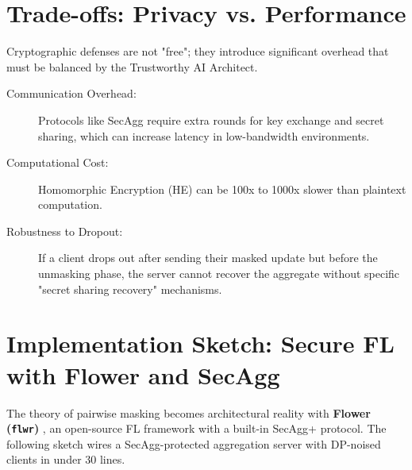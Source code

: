 \section{Trade-offs: Privacy vs. Performance}
\label{sec:secagg_tradeoffs}

Cryptographic defenses are not "free"; they introduce significant overhead that must be balanced by the Trustworthy AI Architect.

\begin{description}
  \item[Communication Overhead:] 
        Protocols like SecAgg require extra rounds for key exchange and secret sharing, which can increase latency in low-bandwidth environments.
  \item[Computational Cost:]
        Homomorphic Encryption (HE) can be 100x to 1000x slower than plaintext computation.
  \item[Robustness to Dropout:]
        If a client drops out after sending their masked update but before the unmasking phase, the server cannot recover the aggregate without specific "secret sharing recovery" mechanisms.
\end{description}

\section{Implementation Sketch: Secure FL with Flower and SecAgg}
\label{sec:secagg_implementation}

The theory of pairwise masking becomes architectural reality with \textbf{Flower (\texttt{flwr})} \cite{flower}, an open-source FL framework with a built-in SecAgg+ protocol. The following sketch wires a SecAgg-protected aggregation server with DP-noised clients in under 30 lines.


